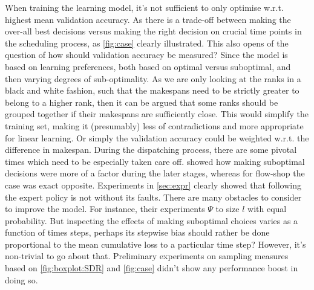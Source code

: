 \documentclass[smallextended]{svjour3}
\begin{document}
When training the learning model, it's not sufficient to only optimise w.r.t. 
highest mean validation accuracy. As there is a trade-off between making the 
over-all best decisions versus making the right decision on crucial time points 
in the scheduling process, as \cref{fig:case} clearly illustrated. 
This also opens of the question of how should validation accuracy be measured? 
Since the model is based on learning preferences, both based on optimal versus 
suboptimal, and then varying degrees of sub-optimality. As we are only looking 
at the ranks in a black and white fashion, such that the makespans need to be 
strictly greater to belong to a higher rank, then it can be argued that some 
ranks should be grouped together if their makespans are sufficiently close. 
This would simplify the training set, making it (presumably) less of 
contradictions and more appropriate for linear learning. Or simply the 
validation accuracy could be weighted w.r.t. the  difference in 
makespan.
During the dispatching process, there are some pivotal times which need to be 
especially taken care off.  showed how making suboptimal 
decisions were more of a factor during the later stages, whereas for flow-shop 
the case was exact opposite. 
Experiments in \cref{sec:expr} clearly showed that following the expert policy 
is not without its faults. There are many obstacles to consider to improve the 
model. For instance, their experiments $\Psi$ to size $l$ with equal 
probability. But inspecting the effects of making suboptimal choices varies as 
a function of times steps, perhaps its stepwise bias should rather be done 
proportional to the mean cumulative loss to a particular time step? 
However, it's non-trivial to go about that. Preliminary experiments on sampling 
measures based on \cref{fig:boxplot:SDR} and \cref{fig:case} didn't show any 
performance boost in doing so.
\end{document}
